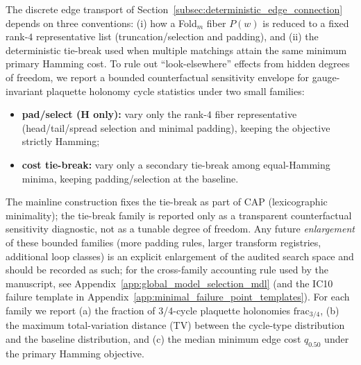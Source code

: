 The discrete edge transport of Section~\ref{subsec:deterministic_edge_connection} depends on three conventions: (i) how a Fold$_m$ fiber $P(w)$ is reduced to a fixed rank-$4$ representative list (truncation/selection and padding), and (ii) the deterministic tie-break used when multiple matchings attain the same minimum primary Hamming cost.
To rule out ``look-elsewhere'' effects from hidden degrees of freedom, we report a bounded counterfactual sensitivity envelope for gauge-invariant plaquette holonomy cycle statistics under two small families:
\begin{itemize}
\item \textbf{pad/select (H only):} vary only the rank-$4$ fiber representative (head/tail/spread selection and minimal padding), keeping the objective strictly Hamming;
\item \textbf{cost tie-break:} vary only a secondary tie-break among equal-Hamming minima, keeping padding/selection at the baseline.
\end{itemize}
\AuditTag The mainline construction fixes the tie-break as part of CAP (lexicographic minimality); the tie-break family is reported only as a transparent counterfactual sensitivity diagnostic, not as a tunable degree of freedom.
\AuditTag Any future \emph{enlargement} of these bounded families (more padding rules, larger transform registries, additional loop classes) is an explicit enlargement of the audited search space and should be recorded as such; for the cross-family accounting rule used by the manuscript, see Appendix~\ref{app:global_model_selection_mdl} (and the IC10 failure template in Appendix~\ref{app:minimal_failure_point_templates}).
For each family we report (a) the fraction of 3/4-cycle plaquette holonomies $\mathrm{frac}_{3/4}$, (b) the maximum total-variation distance (TV) between the cycle-type distribution and the baseline distribution, and (c) the median minimum edge cost $q_{0.50}$ under the primary Hamming objective.

\begin{table}[t]
\centering
\scriptsize
\setlength{\tabcolsep}{3pt}
\renewcommand{\arraystretch}{1.15}
%
\caption{Sensitivity envelope of gauge-invariant plaquette holonomy cycle statistics under bounded counterfactual transport-rule families, for representative balanced anchors $(n,m)=(3,6)$ and $(4,8)$. Rows are generated by \texttt{scripts/exp\_holonomy\_transport\_rule\_sensitivity.py}.}
\label{tab:holonomy_transport_rule_sensitivity}
\end{table}


